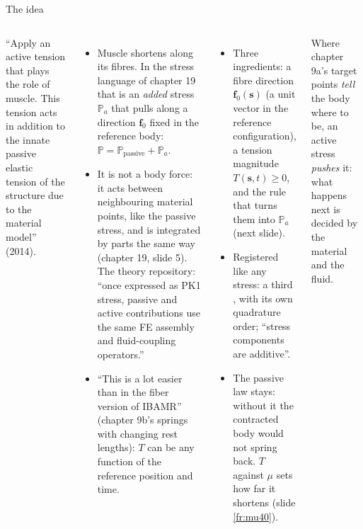 \documentclass[aspectratio=169,11pt]{beamer}
\begin{document}
\begin{frame}{The idea}
\label{fr:idea}
\footnotesize
\begin{columns}[T]
``Apply an active tension that plays the role of muscle. This tension acts in addition to the innate passive elastic tension of the structure due to the material model'' (2014).
\begin{itemize}
  \item Muscle shortens along its fibres. In the stress language of chapter 19 that is an \emph{added} stress $\mathbb{P}_a$ that pulls along a direction $\mathbf{f}_0$ fixed in the reference body: $\mathbb{P} = \mathbb{P}_{\mathrm{passive}} + \mathbb{P}_a$.
  \item It is not a body force: it acts between neighbouring material points, like the passive stress, and is integrated by parts the same way (chapter 19, slide 5). The theory repository: ``once expressed as PK1 stress, passive and active contributions use the same FE assembly and fluid-coupling operators.''
  \item ``This is a lot easier than in the fiber version of IBAMR'' (chapter 9b's springs with changing rest lengths): $T$ can be any function of the reference position and time.
\end{itemize}
\begin{itemize}
  \item Three ingredients: a fibre direction $\mathbf{f}_0(\mathbf{s})$ (a unit vector in the reference configuration), a tension magnitude $T(\mathbf{s}, t) \ge 0$, and the rule that turns them into $\mathbb{P}_a$ (next slide).
  \item Registered like any stress: a third , with its own quadrature order; ``stress components are additive''.
  \item The passive law stays: without it the contracted body would not spring back. $T$ against $\mu$ sets how far it shortens (slide \ref{fr:mu40}).
\end{itemize}
\begin{punchbox}
\footnotesize Where chapter 9a's target points \emph{tell} the body where to be, an active stress \emph{pushes} it: what happens next is decided by the material and the fluid.
\end{punchbox}
\end{columns}
\end{frame}
\end{document}
